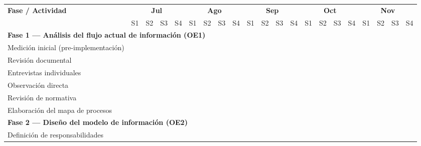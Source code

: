 \begin{table}[H]
\centering
\renewcommand{\arraystretch}{1.2}
\setlength{\tabcolsep}{1.5pt}
\footnotesize
\begin{tabular}{|p{3.8cm}|
  *{20}{p{0.28cm}|}
}
\hline
\multirow{2}{*}{\textbf{Fase / Actividad}}
  & \multicolumn{4}{c|}{\textbf{Jul}}
  & \multicolumn{4}{c|}{\textbf{Ago}}
  & \multicolumn{4}{c|}{\textbf{Sep}}
  & \multicolumn{4}{c|}{\textbf{Oct}}
  & \multicolumn{4}{c|}{\textbf{Nov}}
\\ \cline{2-21}
  & \tiny S1 & \tiny S2 & \tiny S3 & \tiny S4
  & \tiny S1 & \tiny S2 & \tiny S3 & \tiny S4
  & \tiny S1 & \tiny S2 & \tiny S3 & \tiny S4
  & \tiny S1 & \tiny S2 & \tiny S3 & \tiny S4
  & \tiny S1 & \tiny S2 & \tiny S3 & \tiny S4
\\ \hline

\multicolumn{21}{|l|}{%
  \textbf{Fase 1 --- Análisis del flujo actual de información (OE1)}} \\ \hline

Medición inicial (pre-implementación)
  & \cellcolor{black!80} & \cellcolor{black!80}
  & & & & & & & & & & & & & & & & & & \\ \hline

Revisión documental
  & \cellcolor{black!80} & \cellcolor{black!80} & \cellcolor{black!80}
  & & & & & & & & & & & & & & & & & \\ \hline

Entrevistas individuales
  & & & \cellcolor{black!80} & \cellcolor{black!80}
  & & & & & & & & & & & & & & & & \\ \hline

Observación directa
  & & & & \cellcolor{black!80}
  & \cellcolor{black!80} & & & & & & & & & & & & & & & \\ \hline

Revisión de normativa
  & & & & & \cellcolor{black!80} & \cellcolor{black!80}
  & & & & & & & & & & & & & & \\ \hline

Elaboración del mapa de procesos
  & & & & & & & \cellcolor{black!80} & \cellcolor{black!80}
  & & & & & & & & & & & & \\ \hline

\multicolumn{21}{|l|}{%
  \textbf{Fase 2 --- Diseño del modelo de información (OE2)}} \\ \hline

Definición de responsabilidades
  & & & & & & & & & \cellcolor{black!80} & \cellcolor{black!80}
  & & & & & & & & & & \\ \hline


\end{tabular}
\end{table}
